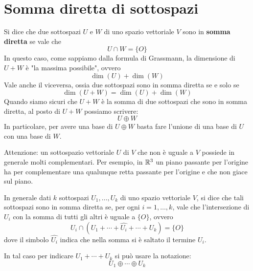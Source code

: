 \section{Somma diretta di sottospazi}
Si dice che due sottospazi $U$ e $W$ di uno spazio vettoriale $V$ sono in
\textbf{somma diretta} se vale che \[ U \cap W = \{O\} \] In questo caso,
come sappiamo dalla formula di Grassmann, la dimensione di $U + W$ è "la
massima possibile", ovvero \[ \dim(U) + \dim(W) \] Vale anche il
viceversa, ossia due sottospazi sono in somma diretta se e solo se
\[ \dim(U + W) = \dim(U) + \dim(W) \] Quando siamo sicuri che $U + W$ è la somma di due
sottospazi che sono in somma diretta, al posto di $U + W$ possiamo scrivere:
\[
	U \oplus W
\]
In particolare, per avere una base di $U \oplus W$ basta fare l'unione di una
base di $U$ con una base di $W$.

\begin{observation}
	Attenzione: un sottospazio vettoriale $U$ di $V$ che non è uguale a $V$
	possiede in generale molti complementari. Per esempio, in $\mathbb{R}^3$
	un piano passante per l'origine ha per complementare una qualunque retta
	passante per l'origine e che non giace sul piano.
\end{observation}

In generale dati $k$ sottospazi $U_1, \dots, U_k$ di uno spazio vettoriale $V$,
si dice che tali sottospazi sono in somma diretta se, per ogni
$i = 1, \dots, k$, vale che l'intersezione di $U_i$ con la somma di tutti
gli altri è uguale a $\{O\}$, ovvero
\[
	U_i \cap (U_1 + \cdots + \hat{U_i} + \cdots + U_k) = \{O\}
\]
dove il simbolo $\hat{U_i}$ indica che nella somma si è saltato il termine
$U_i$.

In tal caso per indicare $U_1 + \cdots + U_k$ si può usare la notazione:
\[
	U_1 \oplus \cdots \oplus U_k
\]
